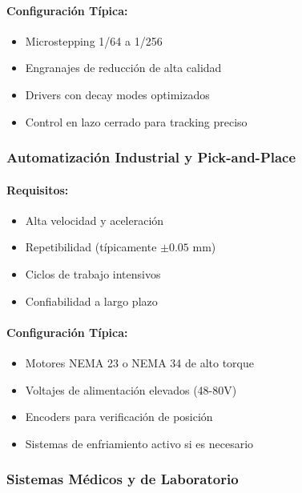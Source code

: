 \paragraph{Configuración Típica:}

\begin{itemize}
    \item Microstepping 1/64 a 1/256
    \item Engranajes de reducción de alta calidad
    \item Drivers con decay modes optimizados
    \item Control en lazo cerrado para tracking preciso
\end{itemize}

\subsubsection{Automatización Industrial y Pick-and-Place}

\paragraph{Requisitos:}

\begin{itemize}
    \item Alta velocidad y aceleración
    \item Repetibilidad (típicamente $\pm 0.05$ mm)
    \item Ciclos de trabajo intensivos
    \item Confiabilidad a largo plazo
\end{itemize}

\paragraph{Configuración Típica:}

\begin{itemize}
    \item Motores NEMA 23 o NEMA 34 de alto torque
    \item Voltajes de alimentación elevados (48-80V)
    \item Encoders para verificación de posición
    \item Sistemas de enfriamiento activo si es necesario
\end{itemize}

\subsubsection{Sistemas Médicos y de Laboratorio}

